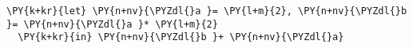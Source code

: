 \begin{Verbatim}[commandchars=\\\{\}]
\PY{k+kr}{let} \PY{n+nv}{\PYZdl{}a }= \PY{l+m}{2}, \PY{n+nv}{\PYZdl{}b }= \PY{n+nv}{\PYZdl{}a }* \PY{l+m}{2}
  \PY{k+kr}{in} \PY{n+nv}{\PYZdl{}b }+ \PY{n+nv}{\PYZdl{}a}
\end{Verbatim}
